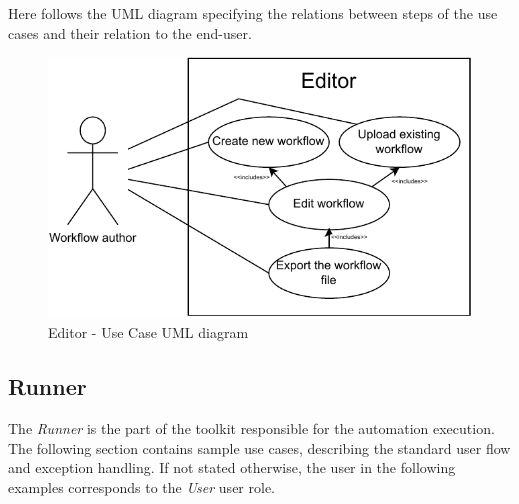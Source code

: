 Here follows the UML diagram specifying the relations between steps of the use cases and their relation to the end-user.

\begin{center}
\begin{figure}[h]
    \includegraphics{./img/editorUC.pdf}
    \caption{Editor - Use Case UML diagram}
\end{figure}
\end{center}

\clearpage
\subsection{Runner}

The \textit{Runner} is the part of the toolkit responsible for the automation execution.
The following section contains sample use cases, describing the standard user flow and exception handling.
If not stated otherwise, the user in the following examples corresponds to the \textit{User} user role. \

\setcounter{usecases}{1}

\def \usecase {Use Case \numb{usecases}}

